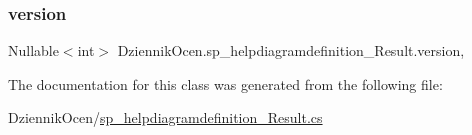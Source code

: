 \mbox{\label{class_dziennik_ocen_1_1sp__helpdiagramdefinition___result_a8afb8aff3d7c8bd2fb9e2ab0a33ddfd9}} 
\subsubsection{\texorpdfstring{version}{version}}
{\footnotesize\ttfamily Nullable$<$int$>$ Dziennik\+Ocen.\+sp\+\_\+helpdiagramdefinition\+\_\+\+Result.\+version\hspace{0.3cm}{\ttfamily [get]}, {\ttfamily [set]}}



The documentation for this class was generated from the following file\+:\begin{DoxyCompactItemize}
\item 
Dziennik\+Ocen/\hyperlink{sp__helpdiagramdefinition___result_8cs}{sp\+\_\+helpdiagramdefinition\+\_\+\+Result.\+cs}\end{DoxyCompactItemize}
